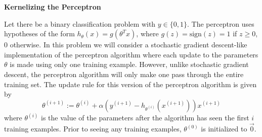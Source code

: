 \item {} {\bf Kernelizing the Perceptron}

Let there be a binary classification problem with $y \in \{0, 1\}$.  The
perceptron uses hypotheses of the form $h_\theta(x) = g(\theta^T x)$, where
$g(z) = \text{sign}(z) = 1$ if $z \ge 0$, $0$ otherwise.  In this problem we
will consider a stochastic gradient descent-like implementation of the
perceptron algorithm where each update to the parameters $\theta$ is made using
only one training example.  However, unlike stochastic gradient descent, the
perceptron algorithm will only make one pass through the entire training set.
The update rule for this version of the perceptron algorithm is given by
\begin{equation*}
  \theta^{(i+1)} :=
	  \theta^{(i)} + \alpha (y^{(i+1)} - h_{\theta^{(i)}}(x^{(i+1)})) x^{(i+1)}
\end{equation*}
where $\theta^{(i)}$ is the value of the parameters after the algorithm has
seen the first $i$ training examples. Prior to seeing any training examples,
$\theta^{(0)}$ is initialized to $\vec{0}$.

\begin{enumerate}
  
 
  \ifnum{} {
    
  } \fi

  
  
  \ifnum{} {
    
  } \fi

  
  
  \ifnum{} {
    
  } \fi
\end{enumerate}

